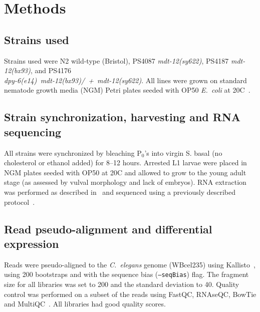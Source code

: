 \documentclass[10pt, twocolumn]{article}
\newcommand{\cel}{\emph{C.~elegans}}
\newcommand{\ecol}{\emph{E.~coli}}
\newcommand{\gene}[1]{\mbox{\emph{#1}}}
\begin{document}
\section*{Methods}
\label{sec:methods}
\subsection*{Strains used}
Strains used were N2 wild-type (Bristol),
PS4087 \gene{mdt-12(sy622)},
PS4187 \gene{mdt-12(bx93)},
and PS4176\\ \gene{dpy-6(e14) mdt-12(bx93)/ + mdt-12(sy622)}.
All lines were grown on standard nematode growth media (NGM) Petri plates seeded
with OP50 \ecol{} at 20\degree{}C~\cite{Brenner1974}.

\subsection*{Strain synchronization, harvesting and RNA sequencing}
All strains were synchronized by bleaching
P$_0$'s into virgin S. basal (no cholesterol or ethanol added) for 8--12 hours.
Arrested L1 larvae were placed in NGM plates seeded with OP50 at 20\degree{}C
and allowed to grow to the young adult stage (as assessed by vulval morphology
and lack of  embryos). RNA extraction was performed as described
in~\cite{AngelesAlboresHIF} and sequenced using a previously described
protocol~\cite{Angeles-Albores2017}.

\subsection*{Read pseudo-alignment and differential expression}
Reads were pseudo-aligned to the \cel{} genome (WBcel235) using
Kallisto~\cite{Bray2016}, using 200 bootstraps and with the sequence bias
(\texttt{--seqBias}) flag. The fragment size for all libraries was set to 200
and the standard deviation to 40. Quality control was performed on a subset of
the reads using FastQC, RNAseQC, BowTie and
MultiQC~\cite{Andrews2010,Deluca2012,Langmead2009,Ewels2016}. All libraries had
good quality scores.
\end{document}
